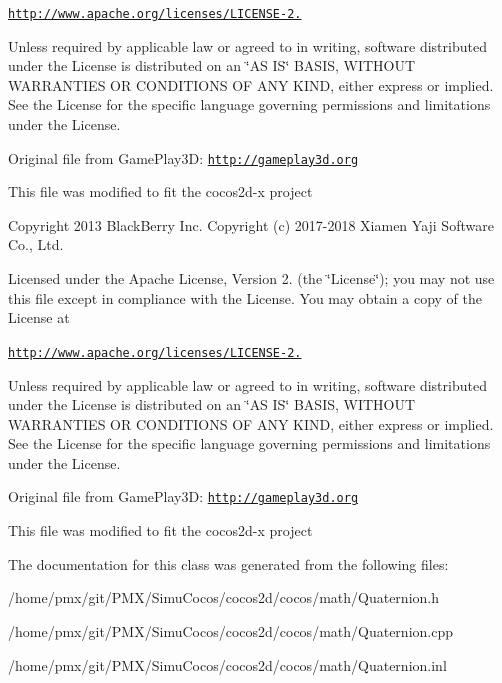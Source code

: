 \href{http://www.apache.org/licenses/LICENSE-2.0}{\tt http\+://www.\+apache.\+org/licenses/\+L\+I\+C\+E\+N\+S\+E-\/2.}

Unless required by applicable law or agreed to in writing, software distributed under the License is distributed on an \char`\"{}\+A\+S I\+S\char`\"{} B\+A\+S\+IS, W\+I\+T\+H\+O\+UT W\+A\+R\+R\+A\+N\+T\+I\+ES OR C\+O\+N\+D\+I\+T\+I\+O\+NS OF A\+NY K\+I\+ND, either express or implied. See the License for the specific language governing permissions and limitations under the License.

Original file from Game\+Play3D\+: \href{http://gameplay3d.org}{\tt http\+://gameplay3d.\+org}

This file was modified to fit the cocos2d-\/x project

Copyright 2013 Black\+Berry Inc. Copyright (c) 2017-\/2018 Xiamen Yaji Software Co., Ltd.

Licensed under the Apache License, Version 2. (the \char`\"{}\+License\char`\"{}); you may not use this file except in compliance with the License. You may obtain a copy of the License at

\href{http://www.apache.org/licenses/LICENSE-2.0}{\tt http\+://www.\+apache.\+org/licenses/\+L\+I\+C\+E\+N\+S\+E-\/2.}

Unless required by applicable law or agreed to in writing, software distributed under the License is distributed on an \char`\"{}\+A\+S I\+S\char`\"{} B\+A\+S\+IS, W\+I\+T\+H\+O\+UT W\+A\+R\+R\+A\+N\+T\+I\+ES OR C\+O\+N\+D\+I\+T\+I\+O\+NS OF A\+NY K\+I\+ND, either express or implied. See the License for the specific language governing permissions and limitations under the License.

Original file from Game\+Play3D\+: \href{http://gameplay3d.org}{\tt http\+://gameplay3d.\+org}

This file was modified to fit the cocos2d-\/x project 

The documentation for this class was generated from the following files\+:\begin{DoxyCompactItemize}
\item 
/home/pmx/git/\+P\+M\+X/\+Simu\+Cocos/cocos2d/cocos/math/Quaternion.\+h\item 
/home/pmx/git/\+P\+M\+X/\+Simu\+Cocos/cocos2d/cocos/math/Quaternion.\+cpp\item 
/home/pmx/git/\+P\+M\+X/\+Simu\+Cocos/cocos2d/cocos/math/Quaternion.\+inl\end{DoxyCompactItemize}
